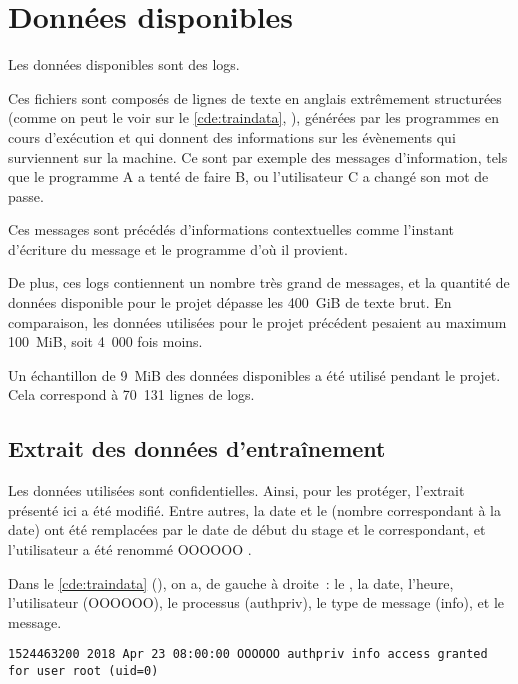 \chapter{Données disponibles}\label{ch:data_papud}
Les données disponibles sont des \glspl{log}.

Ces fichiers sont composés de lignes de texte en anglais extrêmement structurées (comme on peut le voir sur le \autoref{cde:traindata}, ), générées par les programmes en cours d'exécution et qui donnent des informations sur les évènements qui surviennent sur la machine.
Ce sont par exemple des messages d'information, tels que \og le programme A a tenté de faire B\fg{}, ou \og l'utilisateur C a changé son mot de passe\fg{}.

Ces messages sont précédés d'informations contextuelles comme l'instant d'écriture du message et le programme d'où il provient.

De plus, ces \glspl{log} contiennent un nombre très grand de messages, et la quantité de données disponible pour le projet dépasse les 400~GiB de texte brut. En comparaison, les données utilisées pour le projet précédent pesaient au maximum 100~MiB, soit 4~000 fois moins.

Un échantillon de 9~MiB des données disponibles a été utilisé pendant le projet.
Cela correspond à 70~131 lignes de \glspl{log}.

\section{Extrait des données d'entraînement}%
Les données utilisées sont confidentielles.
Ainsi, pour les protéger, l'extrait présenté ici a été modifié.
Entre autres, la date et le  (nombre correspondant à la date) ont été remplacées par le date de début du stage et le  correspondant, et l'utilisateur a été renommé \og OOOOOO \fg{}.

Dans le \autoref{cde:traindata} (), on a, de gauche à droite~: le , la date, l'heure, l'utilisateur (OOOOOO), le processus (authpriv), le type de message (info), et le message.

\begin{lstlisting}[caption={Exemple de ligne extraite d'un des fichiers de journalisation},label=cde:traindata]
	1524463200 2018 Apr 23 08:00:00 OOOOOO authpriv info access granted for user root (uid=0)
\end{lstlisting}

